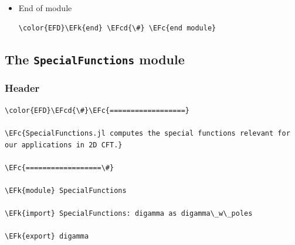 \documentclass[a4paper]{article}
\numberwithin{equation}{section}
\newcommand{\EFc}[1]{\textcolor{EFc}{#1}} %
\newcommand{\EFcd}[1]{\textcolor{EFcd}{#1}} %
\newcommand{\EFs}[1]{\textcolor{EFs}{#1}} %
\newcommand{\EFk}[1]{\textcolor{EFk}{#1}} %
\newcommand{\EFf}[1]{\textcolor{EFf}{#1}} %
\newcommand{\EFt}[1]{\textcolor{EFt}{#1}} %
\begin{document}
\begin{itemize}
\begin{Code}
\begin{Verbatim}
\EFs{"""}
    \EFs{block\_chiral\_schan(block::FourPointBlockSphere, corr::FourPointCorrelation, x, lr)}

\EFs{Compute the chiral conformal block}

\EFs{``\char92{}\char92{}mathcal F\char94{}\{\char92{}text\{torus\}\}\_\{\char92{}\char92{}delta\}(x)``}

\EFs{"""}
\EFk{function} \EFf{block\_chiral}(τ, Nmax, block\EFt{::OnePointBlockTorus}, corr\EFt{::OnePointCorrelation}, lr)
    δ = block.channelField[\EFs{"δ"}][lr]
    \EFk{return} q\EFt{\char94{}}δ\EFt{/}η(τ) \EFt{*} H(qfromtau(τ), Nmax, block, corr, lr)
\EFk{end}

\EFs{"""}
\EFs{Compute the non-chiral conformal block}

\EFs{`` \char92{}\char92{}mathcal F\_\{\char92{}\char92{}Delta\}\char94{}\{(\char92{}\char92{}text\{chan\})\}(\char92{}\char92{}Delta\_i| x)``}

\EFs{where ``\char92{}\char92{}text\{chan\}`` is `s`,`t` or `u`.}

\textcolor[HTML]{ff8e00}{\textbf{TODO:}} \EFs{logarithmic blocks}
\EFs{"""}
\EFk{function} \EFf{F\_one\_point\_torus}(τ, Nmax, block\EFt{::OnePointBlockTorus}, corr\EFt{::OnePointCorrelation})
    block\_chiral(τ, Nmax, block, corr, left) \EFt{*} conj(block\_chiral(conj(τ), Nmax, block, corr, right))
\EFk{end}
\end{Verbatim}
\end{Code}
\item End of module
\label{sec:org3c28135}

\begin{Code}
\begin{Verbatim}
\color{EFD}\EFk{end} \EFcd{\#} \EFc{end module}
\end{Verbatim}
\end{Code}
\end{itemize}
\subsection{The \texttt{SpecialFunctions} module}
\label{sec:orgef3febe}
\subsubsection*{Header}
\label{sec:org7ae5406}

\begin{Code}
\begin{Verbatim}
\color{EFD}\EFcd{\#}\EFc{==================}

\EFc{SpecialFunctions.jl computes the special functions relevant for our applications in 2D CFT.}

\EFc{==================\#}

\EFk{module} SpecialFunctions

\EFk{import} SpecialFunctions: digamma as digamma\_w\_poles

\EFk{export} digamma

\end{Verbatim}
\end{Code}
\end{document}
